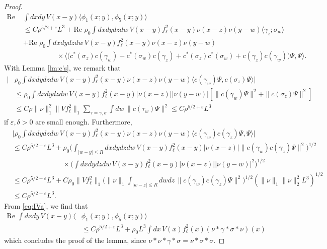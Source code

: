 \documentclass[a4paper,11pt]{article}
\def\eps{\varepsilon}
\numberwithin{equation}{section}
\begin{document}
\begin{proof}
 \begin{equation}\label{eq:IVa} \begin{split}  \text{Re } &\int dx dy \, V(x-y) \langle \phi_1 (x;y) , \phi_5 (x;y) \rangle \\ &\leq  C \rho^{5/2+\eps} L^3 + \text{Re } \rho_0  \int dx dy dz dw \, V(x-y) f_\ell^2 (x-y) \nu (x-z) \nu (y-w)  \langle \gamma_z ; \sigma_w \rangle \\ &+\text{Re } \rho_0  \int dx dy dz dw \, V(x-y) f_\ell^2 (x-y) \nu (x-z) \nu (y-w) \\ &\hspace{2cm} \times \langle \big( c^* (\sigma_z) c (\gamma_w) + c^* (\sigma_w) c (\gamma_z) + c^* (\sigma_z) c^* (\sigma_w) + c(\gamma_z) c (\gamma_w)\big) \Psi, \Psi \rangle . \end{split} \end{equation} 
With Lemma \ref{lm:c's}, we remark that 
\[ \begin{split} 
\Big| &\rho_0 \int dx dy dz dw \, V(x-y) f_\ell^2 (x-y) \nu (x-z) \nu (y-w) \langle c (\gamma_w) \Psi , c (\sigma_z) \Psi \rangle \Big| \\ &\leq \rho_0 \int dx dy dz dw \, V(x-y)f_\ell^2(x-y) |\nu (x-z)| |\nu (y-w)| \left[ \| c (\gamma_w) \Psi \|^2 + \| c (\sigma_z) \Psi \|^2 \right] \\ &\leq C \rho \| \nu \|_1^2 \|Vf_\ell^2\|_1 \sum_{\tau = \gamma, \sigma} \int dw \, \| c (\tau_w) \Psi \|^2 \leq C \rho^{5/2+\eps} L^3 \end{split} \]
if $\eps , \delta > 0$ are small enough. Furthermore,
\[ \begin{split} 
&\Big| \rho_0 \int dx dy dz dw \, V(x-y) f_\ell^2 (x-y) \nu (x-z) \nu (y-w) \langle c (\gamma_w) c (\gamma_z) \Psi , \Psi \rangle \Big| \\ &\leq C \rho^{5/2+\eps} L^3 + \rho_0 \Big( \int_{|w-y| \leq R}  dx dy dz dw \, V(x-y) f_\ell^2(x-y) |\nu (x-z)|  \| c (\gamma_w) c (\gamma_z) \Psi \|^2 \Big)^{1/2}\\ &\hspace{3cm} \times  \Big(  \int dx dy dz dw \, V(x-y) f_\ell^2(x-y) |\nu (x-z)| |\nu (y-w)|^2 \Big)^{1/2}  \\ &\leq C \rho^{5/2+\eps} L^3 + C \rho_0 \|Vf_\ell^2\|_1 \Big(\| \nu \|_1 \int_{|w-z| \leq R} dw dz \, \| c (\gamma_w) c (\gamma_z) \Psi \|^2 \Big)^{1/2} (\| \nu \|_1 \| \nu \|_2^2 L^3)^{1/2} \\ &\leq C \rho^{5/2+\eps} L^3 . \end{split} \]
From \eqref{eq:IVa}, we find that 
\[ \begin{split} 
 \text{Re } \int dx dy \, V(x-y) \langle &\phi_1 (x;y) , \phi_5 (x;y) \rangle \\ &\leq  C \rho^{5/2+\eps} L^3 + \rho_0 L^3  \int dx \, V(x) f_\ell^2 (x) (\nu * \gamma * \sigma * \nu) (x)  
  \end{split} \] 
  which concludes the proof of the lemma, since $\nu * \nu * \gamma * \sigma = \nu * \sigma * \sigma$. 
\end{proof}
\end{document}
